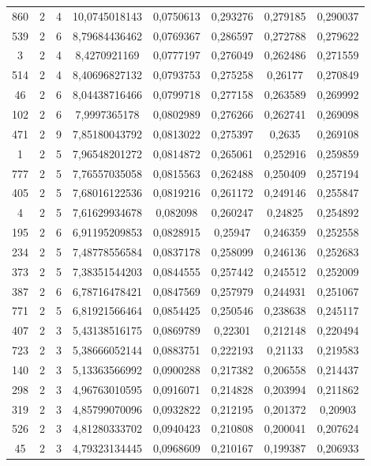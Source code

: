 \begin{longtable}{|c|c|c|c|c|c|c|c|}
860 & 2 & 4 & 10,0745018143 & 0,0750613 & 0,293276 & 0,279185 & 0,290037 \\
539 & 2 & 6 & 8,79684436462 & 0,0769367 & 0,286597 & 0,272788 & 0,279622 \\
3 & 2 & 4 & 8,4270921169 & 0,0777197 & 0,276049 & 0,262486 & 0,271559 \\
514 & 2 & 4 & 8,40696827132 & 0,0793753 & 0,275258 & 0,26177 & 0,270849 \\
46 & 2 & 6 & 8,04438716466 & 0,0799718 & 0,277158 & 0,263589 & 0,269992 \\
102 & 2 & 6 & 7,9997365178 & 0,0802989 & 0,276266 & 0,262741 & 0,269098 \\
471 & 2 & 9 & 7,85180043792 & 0,0813022 & 0,275397 & 0,2635 & 0,269108 \\
1 & 2 & 5 & 7,96548201272 & 0,0814872 & 0,265061 & 0,252916 & 0,259859 \\
777 & 2 & 5 & 7,76557035058 & 0,0815563 & 0,262488 & 0,250409 & 0,257194 \\
405 & 2 & 5 & 7,68016122536 & 0,0819216 & 0,261172 & 0,249146 & 0,255847 \\
4 & 2 & 5 & 7,61629934678 & 0,082098 & 0,260247 & 0,24825 & 0,254892 \\
195 & 2 & 6 & 6,91195209853 & 0,0828915 & 0,25947 & 0,246359 & 0,252558 \\
234 & 2 & 5 & 7,48778556584 & 0,0837178 & 0,258099 & 0,246136 & 0,252683 \\
373 & 2 & 5 & 7,38351544203 & 0,0844555 & 0,257442 & 0,245512 & 0,252009 \\
387 & 2 & 6 & 6,78716478421 & 0,0847569 & 0,257979 & 0,244931 & 0,251067 \\
771 & 2 & 5 & 6,81921566464 & 0,0854425 & 0,250546 & 0,238638 & 0,245117 \\
407 & 2 & 3 & 5,43138516175 & 0,0869789 & 0,22301 & 0,212148 & 0,220494 \\
723 & 2 & 3 & 5,38666052144 & 0,0883751 & 0,222193 & 0,21133 & 0,219583 \\
140 & 2 & 3 & 5,13363566992 & 0,0900288 & 0,217382 & 0,206558 & 0,214437 \\
298 & 2 & 3 & 4,96763010595 & 0,0916071 & 0,214828 & 0,203994 & 0,211862 \\
319 & 2 & 3 & 4,85799070096 & 0,0932822 & 0,212195 & 0,201372 & 0,20903 \\
526 & 2 & 3 & 4,81280333702 & 0,0940423 & 0,210808 & 0,200041 & 0,207624 \\
45 & 2 & 3 & 4,79323134445 & 0,0968609 & 0,210167 & 0,199387 & 0,206933 \\

\end{longtable}

